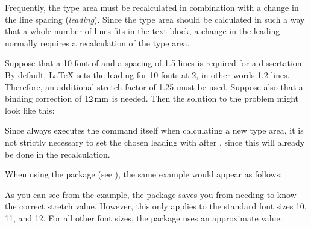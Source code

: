 Frequently, the type area must be recalculated in
combination with a change in the line spacing (\emph{leading}).
Since the type area should be calculated in such a way that a whole number of
lines fits in the text block, a change in the leading normally requires a
recalculation of the type area.
 
\begin{Example}
  Suppose that a 10 font of and a spacing of 1.5 lines is required
  for a dissertation. By default, {\LaTeX} sets the leading for 10
  fonts at 2, in other words 1.2 lines. Therefore, an additional
  stretch factor of 1.25 must be used. Suppose also that a binding correction
  of \(12\Unit{mm}\) is needed. Then the solution to the problem might look
  like this:
  Since  always executes the  command
  itself when calculating a new type area, it is not strictly necessary to
  set the chosen leading with  after ,
  since this will already be done in the recalculation.

  When using the %
   package (see \cite{package:setspace}), the
  same example would appear as follows:
\end{Example}

As you can see from the example, the 
package saves you from needing to know the correct stretch value. However,
this only applies to the standard font sizes 10, 11, and
12.  For all other font sizes, the package uses an approximate value.

